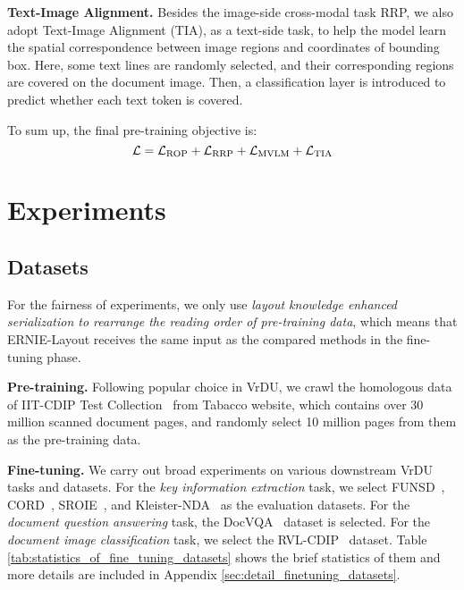\documentclass[11pt]{article}
\begin{document}
\noindent\textbf{Text-Image Alignment.} 
Besides the image-side cross-modal task RRP, we also adopt Text-Image Alignment (TIA), as a text-side task, to help the model learn the spatial correspondence between image regions and coordinates of bounding box.
Here, some text lines are randomly selected, and their corresponding regions are covered on the document image.
Then, a classification layer is introduced to predict whether each text token is covered.

To sum up, the final pre-training objective is:
\begin{equation}
\mathcal{L} = \mathcal{L}_{\rm ROP} + \mathcal{L}_{\rm RRP} + \mathcal{L}_{\rm MVLM} + \mathcal{L}_{\rm TIA}
\end{equation}




\section{Experiments}

\subsection{Datasets}

For the fairness of experiments, we only use \emph{layout knowledge enhanced serialization to rearrange the reading order of pre-training data}, which means that ERNIE-Layout receives the same input as the compared methods in the fine-tuning phase.

\noindent\textbf{Pre-training.}
Following popular choice in VrDU, we crawl the homologous data of IIT-CDIP Test Collection~\cite{lewis2006building} from Tabacco website, which contains over 30 million scanned document pages, and randomly select 10 million pages from them as the pre-training data. 

\noindent\textbf{Fine-tuning.}
We carry out broad experiments on various downstream VrDU tasks and datasets.
For the \emph{key information extraction} task, we select FUNSD~\cite{jain2019multimodal}, CORD~\cite{park2019cord}, SROIE~\cite{huang2019icdar2019}, and Kleister-NDA~\cite{gralinski2021kleister} as the evaluation datasets.
For the \emph{document question answering} task, the DocVQA~\cite{mathew2021docvqa} dataset is selected.
For the \emph{document image classification} task, we select the RVL-CDIP~\cite{harley2015evaluation} dataset.
Table \ref{tab:statistics_of_fine_tuning_datasets} shows the brief statistics of them and more details are included in Appendix \ref{sec:detail_finetuning_datasets}.
\end{document}
